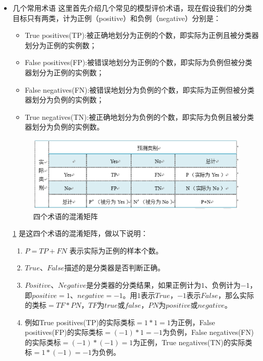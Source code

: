 \begin{itemize}
	\itemsep0em

\item 几个常用术语
这里首先介绍几个常见的模型评价术语，现在假设我们的分类目标只有两类，计为正例（positive）和负例（negative）分别是：

		\begin{itemize}
	\itemsep0em
			\item True positives(TP):被正确地划分为正例的个数，即实际为正例且被分类器划分为正例的实例数；
   		\item False positives(FP):被错误地划分为正例的个数，即实际为负例但被分类器划分为正例的实例数；
   		\item False negatives(FN):被错误地划分为负例的个数，即实际为正例但被分类器划分为负例的实例数；
   		\item True negatives(TN):被正确地划分为负例的个数，即实际为负例且被分类器划分为负例的实例数。　
		\end{itemize}

 \begin{figure}[h]
   \centering
   \includegraphics[width=.7\textwidth]{imgs/2.9.1.eps}
   \caption{四个术语的混淆矩阵}
   \label{fig:2.2}
 \end{figure}

		\ref{fig:2.2} 是这四个术语的混淆矩阵，做以下说明：

		\begin{enumerate}
			\itemsep0em
			\item $P=TP+FN$ 表示实际为正例的样本个数。
			\item $True$、$False$描述的是分类器是否判断正确。
			\item $Positive$、$Negative$是分类器的分类结果，如果正例计为$1$、负例计为$-1$，即$positive=1$、$negative=-1$。用$1$表示$True$，$-1$表示$False$，那么实际的类标$=TF*PN$，$TF$为$true$或$false$，$PN$为$positive$或$negative$。
			\item 例如True positives(TP)的实际类标$=1*1=1$为正例，False positives(FP)的实际类标$=(-1)*1=-1$为负例，False negatives(FN)的实际类标$=(-1)*(-1)=1$为正例，True negatives(TN)的实际类标$=1*(-1)=-1$为负例。
		\end{enumerate}


\end{itemize}
